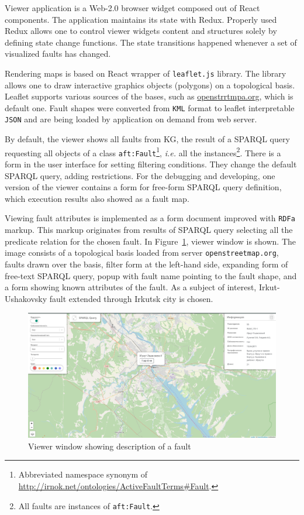 \documentclass[
]{ceurart}
\begin{document}
Viewer application is a Web-2.0 browser widget composed out of React components.  The application maintains its state with Redux. Properly used Redux allows one to control viewer widgets content and structures solely by defining state change functions.  The state transitions happened whenever a set of visualized faults has changed.

Rendering maps is based on React wrapper of \texttt{leaflet.js} library.  The library allows one to draw interactive graphics objects (polygons) on a topological basis.  Leaflet supports various sources of the bases, such as \href{https://openstreetmap.org/}{openstrrtmpa.org}, which is default one.  Fault shapes were converted from \texttt{KML} format to leaflet interpretable \texttt{JSON} and are being loaded by application on demand from web server.

By default, the viewer shows all faults from KG, the result of a SPARQL query requesting all objects of a class \texttt{aft:Fault}\footnote{Abbreviated namespace synonym of \url{http://irnok.net/ontologies/ActiveFaultTerms\#Fault}.}, \emph{i.e.} all the instances\footnote{All faults are instances of \texttt{aft:Fault}.}.  There is a form in the user interface for setting filtering conditions.  They change the default SPARQL query, adding restrictions.  For the debugging and developing, one version of the viewer contains a form for free-form SPARQL query definition, which execution results also showed as a fault map.

Viewing fault attributes is implemented as a form document improved with \texttt{RDFa} markup.  This markup originates from results of SPARQL query selecting all the predicate relation for the chosen fault.
%
%
In Figure~\ref{fig:ex}, viewer window is shown.  The image consists of a topological basis loaded from server \texttt{openstreetmap.org}, faults drawn over the basis, filter form at the left-hand side, expanding form of free-text SPARQL query, popup with fault name pointing to the fault shape, and a form showing known attributes of the fault.  As a subject of interest, Irkut-Ushakovsky fault extended through Irkutsk city is chosen.

\begin{figure}
  \centering
  \includegraphics[width=\linewidth]{faults-leaflet-doc.png}
  \caption{Viewer window showing description of a fault}
  \label{fig:ex}
\end{figure}
\end{document}
